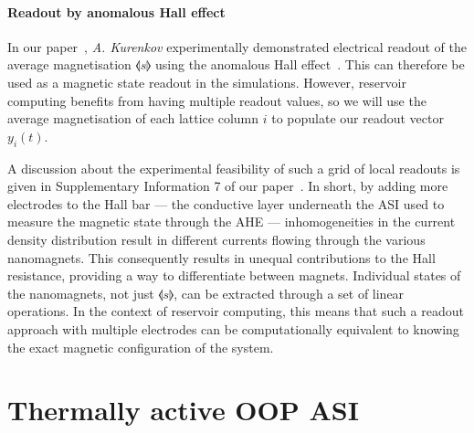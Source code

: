 \paragraph{Readout by anomalous Hall effect}
In our paper~\cite{KUR-24}, \textit{A. Kurenkov} experimentally demonstrated electrical readout of the average magnetisation $\llangle s \rrangle$ using the anomalous Hall effect~\cite{AHE}.
This can therefore be used as a magnetic state readout in the simulations.
However, reservoir computing benefits from having multiple readout values, so we will use the average magnetisation of each lattice column $i$ to populate our readout vector $y_i(t)$. \par %
A discussion about the experimental feasibility of such a grid of local readouts is given in Supplementary Information 7 of our paper~\cite{KUR-24}.
In short, by adding more electrodes to the Hall bar --- the conductive layer underneath the ASI used to measure the magnetic state through the AHE --- inhomogeneities in the current density distribution result in different currents flowing through the various nanomagnets.
This consequently results in unequal contributions to the Hall resistance, providing a way to differentiate between magnets.
Individual states of the nanomagnets, not just $\llangle s \rrangle$, can be extracted through a set of linear operations.
In the context of reservoir computing, this means that such a readout approach with multiple electrodes can be computationally equivalent to knowing the exact magnetic configuration of the system.


\section{Thermally active OOP ASI}
